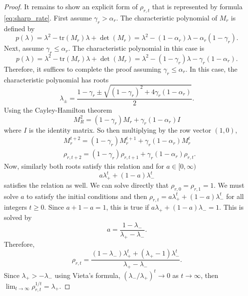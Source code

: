 \documentclass[10pt,a4paper]{amsart}
\newcommand{\tr}{\text{tr}}
\begin{document}
\begin{proof}
It remains to show an explicit form of $\rho_{r, t}$ that is represented by formula \eqref{eq:sharp_rate}.
First assume $\gamma_r > \alpha_r$.
The characteristic polynomial of $M_r$ is defined by
\[
p(\lambda)
= \lambda^2 - \tr(M_r) \lambda + \det(M_r)
=  \lambda^2 - (1 - \alpha_r) \lambda - \alpha_r (1 - \gamma_r).
\]
Next, assume $\gamma_r \le \alpha_r$.
The characteristic polynomial in this case is
\[
p(\lambda)
= \lambda^2 - \tr(M_r) \lambda + \det(M_r)
= \lambda^2 - (1 - \gamma_r) \lambda - \gamma_r (1 - \alpha_r).
\]
Therefore, it suffices to complete the proof assuming $\gamma_r \le \alpha_r$. 
In this case, the characteristic polynomial has roots
\[
\lambda_{\pm} = \frac{1 - \gamma_r \pm \sqrt{ (1 - \gamma_r)^2 + 4 \gamma_r (1 - \alpha_r) } }{2}.
\]
Using the Cayley-Hamilton theorem
\[
M_R^2 = (1 - \gamma_r) M_r + \gamma_r (1 - \alpha_r) I
\]
where $I$ is the identity matrix.
So then multiplying by the row vector $(1, 0)$,
\begin{align*}
&M_r^{t + 2} = (1 - \gamma_r) M_r^{t + 1} + \gamma_r (1 - \alpha_r) M_r^t
\\
&\rho_{r, t + 2} = (1 - \gamma_r) \rho_{r, t + 1} + \gamma_r (1 - \alpha_r) \rho_{r, t}.
\end{align*}
Now, similarly both roots satisfy this relation and for $a \in [0, \infty)$
\[
a \lambda_+^t + (1 - a) \lambda_-^t
\]
satisfies the relation as well.
We can solve directly that $\rho_{r, 0} = \rho_{r, 1} = 1$.
We must solve $a$ to satisfy the initial conditions and then $\rho_{r, t} = a \lambda_+^t + (1 - a) \lambda_-^t$ for all integers $t \ge 0$.
Since $a + 1 - a = 1$, this is true if
$
a \lambda_+ + (1 - a) \lambda_- = 1.
$
This is solved by 
\[
a = \frac{1 - \lambda_-}{ \lambda_+ - \lambda_- }.
\]
Therefore,
\[
\rho_{r, t}
= \frac{(1 - \lambda_-) \lambda_+^t + (\lambda_+ - 1) \lambda_-^t }{ \lambda_+ - \lambda_- }.
\]
Since $\lambda_+ > -\lambda_-$ using Vieta's formula, $(\lambda_- / \lambda_+)^t \to 0$ as $t \to \infty$, then $\lim_{t \to \infty} \rho_{r, t}^{1/t} = \lambda_+$.
\end{proof}
\end{document}
